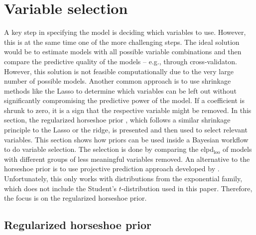 \section{Variable selection}
\label{ch:varsel}
A key step in specifying the model is deciding which variables to use.
However, this is at the same time one of the more challenging steps.
The ideal solution would be to estimate models with all possible variable combinations and then compare the predictive quality of the models – e.g., through cross-validaton.
However, this solution is not feasible computationally due to the very large number of possible models.
Another common approach is to use shrinkage methods like the Lasso \citep{tibshirani_regression_1996} to determine which variables can be left out without significantly compromising the predictive power of the model.
If a coefficient is shrunk to zero, it is a sign that the respective variable might be removed.
In this section, the regularized horseshoe prior \citep{piironen_sparsity_2017}, which follows a similar shrinkage principle to the Lasso or the ridge, is presented and then used to select relevant variables.
This section shows how priors can be used inside a Bayesian workflow to do variable selection.
The selection is done by comparing the elpd$_{\text{loo}}$ of models with different groups of less meaningful variables removed. An alternative to the horseshoe prior is to use projective prediction approach developed by \cite{piironen_projective_2020}.
Unfortunately, this only works with distributions from the exponential family, which does not include the Student's $t$-distribution used in this paper.
Therefore, the focus is on the regularized horseshoe prior.

\subsection{Regularized horseshoe prior}

